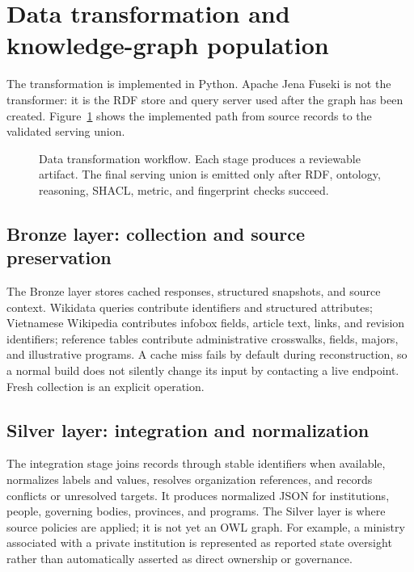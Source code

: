 \section{Data transformation and knowledge-graph population}
\label{sec:transform}
The transformation is implemented in Python. Apache Jena Fuseki is not the transformer: it
is the RDF store and query server used after the graph has been created. Figure~\ref{fig:transform-flow}
shows the implemented path from source records to the validated serving union.

\begin{figure}[htbp]\centering
\resizebox{\textwidth}{!}{}
\caption[Data transformation workflow]{Data transformation workflow. Each stage produces a
reviewable artifact. The final serving union is emitted only after RDF, ontology, reasoning,
SHACL, metric, and fingerprint checks succeed.}
\label{fig:transform-flow}
\end{figure}

\subsection{Bronze layer: collection and source preservation}
The Bronze layer stores cached responses, structured snapshots, and source context. Wikidata
queries contribute identifiers and structured attributes; Vietnamese Wikipedia contributes
infobox fields, article text, links, and revision identifiers; reference tables contribute
administrative crosswalks, fields, majors, and illustrative programs. A cache miss fails by
default during reconstruction, so a normal build does not silently change its input by
contacting a live endpoint. Fresh collection is an explicit operation.

\subsection{Silver layer: integration and normalization}
The integration stage joins records through stable identifiers when available, normalizes
labels and values, resolves organization references, and records conflicts or unresolved
targets. It produces normalized JSON for institutions, people, governing bodies, provinces,
and programs. The Silver layer is where source policies are applied; it is not yet an OWL
graph. For example, a ministry associated with a private institution is represented as
reported state oversight rather than automatically asserted as direct ownership or governance.

